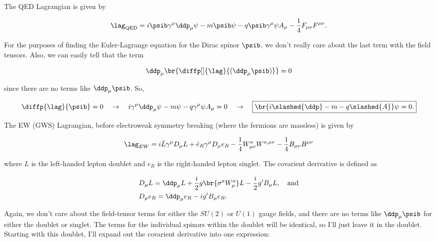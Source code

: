 \section{}

The QED Lagrangian is given by

\begin{equation}
  \lag_{\mathrm{QED}} = i\psib \gamma^\mu \ddp_\mu \psi - m\psib\psi - q\psib \gamma^\mu \psi A_\mu - \frac{1}{4}F_{\mu\nu}F^{\mu\nu}.
\end{equation}

For the purposes of finding the Euler-Lagrange equation for the Dirac spinor $\psib$, we don't really care about the last term with the field tensors. Also, we can easily tell that the term

\begin{equation}
  \ddp_\mu \br{\diffp[]{\lag}{(\ddp_\mu \psib)}} = 0
\end{equation}

since there are no terms like $\ddp_\mu \psib$. So,

\begin{equation}
  \diffp{\lag}{\psib} = 0 \quad\rightarrow\quad i\gamma^\mu \ddp_\mu \psi - m\psi - q\gamma^\mu \psi A_\mu = 0 \quad\rightarrow\quad \boxed{\br{i\slashed{\ddp} - m - q\slashed{A}}\psi = 0.}
\end{equation}

The EW (GWS) Lagrangian, before electroweak symmetry breaking (where the fermions are massless) is given by

\begin{equation}
  \lag_{EW} = i\bar{L} \gamma^\mu D_\mu L + \bar{e}_R \gamma^\mu D_{\mu} e_R - \frac{1}{4}W^a_{\mu\nu}W^{a,\mu\nu} - \frac{1}{4}B_{\mu\nu}B^{\mu\nu}
\end{equation}

where $L$ is the left-handed lepton doublet and $e_R$ is the right-handed lepton singlet. The covarient derivative is defined as

\begin{align}
  &D_\mu L = \ddp_\mu L + \frac{i}{2}g \br{\sigma^a W^a_\mu}L - \frac{i}{2}g' B_\mu L, \quad\text{and} \\
  &D_\mu e_R = \ddp_\mu e_R - ig' B_\mu e_R.
\end{align}

Again, we don't care about the field-tensor terms for either the $SU(2)$ or $U(1)$ gauge fields, and there are no terms like $\ddp_\mu\psib$ for either the doublet or singlet. The terms for the individual spinors within the doublet will be identical, so I'll just leave it in the doublet. Starting with this doublet, I'll expand out the covarient derivative into one expression:

